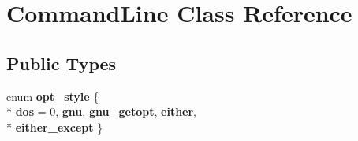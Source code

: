 \hypertarget{classCommandLine}{\section{Command\-Line Class Reference}
\label{classCommandLine}
}
\subsection*{Public Types}
\begin{DoxyCompactItemize}
\item 
enum {\bfseries opt\-\_\-style} \{ \\*
{\bfseries dos} = 0, 
{\bfseries gnu}, 
{\bfseries gnu\-\_\-getopt}, 
{\bfseries either}, 
\\*
{\bfseries either\-\_\-except}
 \}
\end{DoxyCompactItemize}
